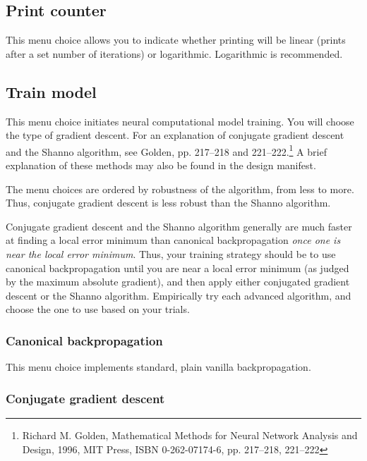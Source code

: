 \subsection{Print counter}

This menu choice allows you to indicate whether printing will be
linear (prints after a set number of iterations) or logarithmic.
Logarithmic is recommended.

\subsection{Train model}

This menu choice initiates neural computational model training.  You
will choose the type of gradient descent.  For an explanation of
conjugate gradient descent and the Shanno algorithm, see Golden, pp.
217--218 and 221--222.\footnote{Richard M. Golden, Mathematical
Methods for Neural Network Analysis and Design, 1996, MIT Press, ISBN
0-262-07174-6, pp. 217--218, 221--222}  A brief explanation of these
methods may also be found in the design manifest.

The menu choices are ordered by robustness of the algorithm, from less
to more.  Thus, conjugate gradient descent is less robust than the
Shanno algorithm.

\vspace{9 pt}{\bf \large \beginred READ THIS! \endcolor}

Conjugate gradient descent and the Shanno algorithm generally are much
faster at finding a local error minimum than canonical backpropagation
{\em once one is near the local error minimum}.  Thus, your training
strategy should be to use canonical backpropagation until you are near
a local error minimum (as judged by the maximum absolute gradient),
and then apply either conjugated gradient descent or the Shanno
algorithm. Empirically try each advanced algorithm, and choose the one
to use based on your trials.

\subsubsection{Canonical backpropagation}

This menu choice implements standard, plain vanilla backpropagation.

\subsubsection{Conjugate gradient descent}

